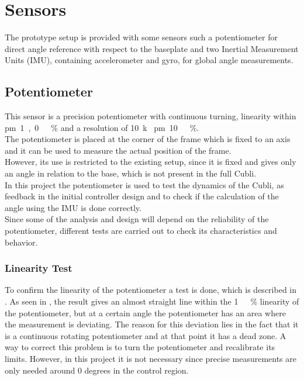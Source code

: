 \section{Sensors}
\label{sec:Sensors}
The prototype setup is provided with some sensors such a potentiometer for direct angle reference with respect to the baseplate and two Inertial Measurement Units (IMU), containing accelerometer and gyro, for global angle measurements.

\subsection{Potentiometer}
This sensor is a precision potentiometer with continuous turning, linearity within \si{\pm1,0\ \%} and a resolution of \SI{10}{k\Omega} \si{\pm10\ \%}.\\
The potentiometer is placed at the corner of the frame which is fixed to an axis and it can be used to measure the actual position of the frame.\\
However, its use is restricted to the existing setup, since it is fixed and gives only an angle in relation to the base, which is not present in the full Cubli.\\
In this project the potentiometer is used to test the dynamics of the Cubli, as feedback in the initial controller design and to check if the calculation of the angle using the IMU is done correctly.\\
Since some of the analysis and design will depend on the reliability of the potentiometer, different tests are carried out to check its characteristics and behavior.
%
\subsubsection{Linearity Test}
To confirm the linearity of the potentiometer a test is done, which is described in . As seen in , the result gives an almost straight line within the \si{1\ \%} linearity of the potentiometer, but at a certain angle the potentiometer has an area where the measurement is deviating. The reason for this deviation lies in the fact that it is a continuous rotating potentiometer and at that point it has a dead zone. A way to correct this problem is to turn the potentiometer and recalibrate its limits. However, in this project it is not necessary since precise measurements are only needed around 0 degrees in the control region.


